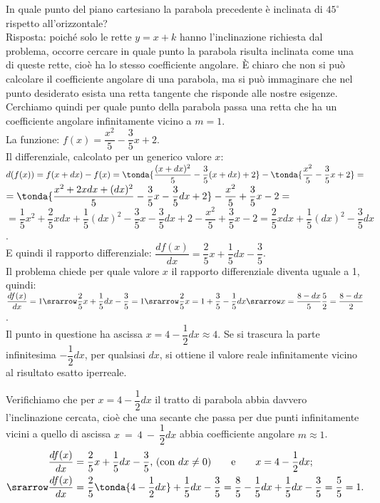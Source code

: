 \begin{esempio}
 In quale punto del piano cartesiano la parabola precedente è inclinata 
 di $45^\circ$ rispetto all'orizzontale?\\
 Risposta: poiché solo le rette $y=x+k$ hanno l'inclinazione richiesta dal 
problema, occorre cercare in quale punto  la parabola risulta inclinata come
una di queste rette, cioè ha lo stesso coefficiente  angolare. 
È chiaro che non si può calcolare il coefficiente angolare di una parabola, 
ma si può immaginare che nel punto desiderato esista una retta tangente che
risponde alle nostre esigenze.\\
Cerchiamo quindi per quale punto della parabola passa una retta che ha un
coefficiente angolare infinitamente vicino a $m=1$.\\
 La funzione: $f(x)=\dfrac{x^2}{5}-\dfrac{3}{5}x+2$.\\
 Il differenziale, calcolato per un generico valore \(x\):\\
 $d(f(x))=f(x+dx)-f(x)=\tonda{\dfrac{(x+dx)^2}{5}-\dfrac{3}{5}(x+dx)+2}
  -\tonda{\dfrac{x^2}{5}-\dfrac{3}{5}x+2}=$\\
 $=\tonda{\dfrac{x^2+2xdx+(dx)^2}{5}-\dfrac{3}{5}x-\dfrac{3}{5}dx+2}
  -\dfrac{x^2}{5}+\dfrac{3}{5}x-2=$\\
 $=\dfrac{1}{5}x^2+\dfrac{2}{5}xdx+\dfrac{1}{5}(dx)^2-\dfrac{3}{5}x-
  \dfrac{3}{5}dx+2-\dfrac{x^2}{5}+\dfrac{3}{5}x-2=
  \dfrac{2}{5}xdx+\dfrac{1}{5}(dx)^2-\dfrac{3}{5}dx$.\\
E quindi il rapporto differenziale: 
$\dfrac{df(x)}{dx}=\dfrac{2}{5}x+\dfrac{1}{5}dx-\dfrac{3}{5}$.\\
Il problema chiede per quale valore \(x\) il rapporto differenziale diventa 
uguale a 1, quindi:\\
$\dfrac{df(x)}{dx}=1 \srarrow 
 \dfrac{2}{5}x+\dfrac{1}{5}dx-\dfrac{3}{5}=1
 \srarrow \dfrac{2}{5}x=1+\dfrac{3}{5}-\dfrac{1}{5}dx
 \srarrow x=\dfrac{8-dx}{5}\dfrac{5}{2}=\dfrac{8-dx}{2}$.\\
 Il punto in questione ha ascissa $x= 4-\dfrac{1}{2}dx \approx 4$. Se si 
 trascura la parte infinitesima $-\dfrac{1}{2}dx$, per qualsiasi $dx$, si 
ottiene
 il valore reale infinitamente vicino al risultato esatto iperreale.
\end{esempio}

Verifichiamo che per $x=4-\dfrac{1}{2}dx$ il tratto di parabola abbia davvero 
l'inclinazione cercata, cioè che una secante che passa per due punti 
infinitamente vicini a quello di ascissa $x~=~4~-~\dfrac{1}{2}dx$ abbia 
coefficiente angolare $m\approx 1$.
\begin{align*}
 &\dfrac{df(x)}{dx}=\dfrac{2}{5}x+\dfrac{1}{5}dx-\dfrac{3}{5} \text{, (con } 
dx\ne 0)
 \qquad  \text{e} \qquad  x=4-\dfrac{1}{2}dx;\\
 \srarrow &\dfrac{df(x)}{dx}=\dfrac{2}{5}\tonda{4-\dfrac{1}{2}dx}
+\dfrac{1}{5}dx-\dfrac{3}{5}=\dfrac{8}{5}-\dfrac{1}{5}dx+
\dfrac{1}{5}dx-\dfrac{3}{5}=\dfrac{5}{5}=1.\\
\end{align*}

